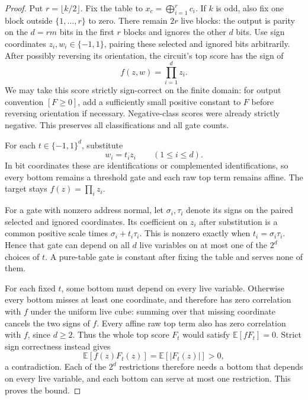 \documentclass[11pt,letterpaper]{article}
\theoremstyle{remark}
\begin{document}
\begin{proof}
Put $r=\lfloor k/2\rfloor$. Fix the table to
$x_c=\bigoplus_{i=1}^r c_i$. If $k$ is odd, also fix one block outside
$\{1,\ldots,r\}$ to zero. There remain $2r$ live blocks: the output is
parity on the $d=rm$ bits in the first $r$ blocks and ignores the other
$d$ bits. Use sign coordinates $z_i,w_i\in\{-1,1\}$, pairing these selected
and ignored bits arbitrarily. After possibly reversing its orientation,
the circuit's top score has the sign of
$$
f(z,w)=\prod_{i=1}^d z_i.
$$
We may take this score strictly sign-correct on the finite domain: for
output convention $[F\ge0]$, add a sufficiently small positive constant
to $F$ before reversing orientation if necessary. Negative-class scores
were already strictly negative. This preserves all classifications and
all gate counts.

For each $t\in\{-1,1\}^d$, substitute
$$
w_i=t_i z_i\qquad(1\le i\le d).
$$
In bit coordinates these are identifications or complemented
identifications, so every bottom remains a threshold gate and each raw
top term remains affine. The target stays $f(z)=\prod_i z_i$.

For a gate with nonzero address normal, let $\sigma_i,\tau_i$ denote its
signs on the paired selected and ignored coordinates. Its coefficient
on $z_i$ after substitution is a common positive scale times
$\sigma_i+t_i\tau_i$. This is nonzero exactly when
$t_i=\sigma_i\tau_i$. Hence that gate can depend on all $d$ live variables
on at most one of the $2^d$ choices of $t$. A pure-table gate is constant
after fixing the table and serves none of them.

For each fixed $t$, some bottom must depend on every live variable.
Otherwise every bottom misses at least one coordinate, and therefore
has zero correlation with $f$ under the uniform live cube: summing over
that missing coordinate cancels the two signs of $f$. Every affine raw
top term also has zero correlation with $f$, since $d\ge2$. Thus the
whole top score $F_t$ would satisfy $\mathbb E[fF_t]=0$. Strict sign
correctness instead gives
$$
\mathbb E[f(z)F_t(z)]=\mathbb E[|F_t(z)|]>0,
$$
a contradiction. Each of the $2^d$ restrictions therefore needs a bottom
that depends on every live variable, and each bottom can serve at most
one restriction. This proves the bound.
\end{proof}
\end{document}
